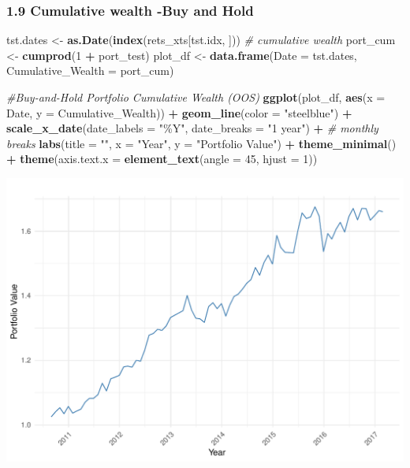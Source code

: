 \documentclass[
  12pt,
]{article}
\newenvironment{Shaded}{\begin{snugshade}}{\end{snugshade}}
\newcommand{\AttributeTok}[1]{\textcolor[rgb]{0.13,0.29,0.53}{#1}}
\newcommand{\CommentTok}[1]{\textcolor[rgb]{0.56,0.35,0.01}{\textit{#1}}}
\newcommand{\DecValTok}[1]{\textcolor[rgb]{0.00,0.00,0.81}{#1}}
\newcommand{\FunctionTok}[1]{\textcolor[rgb]{0.13,0.29,0.53}{\textbf{#1}}}
\newcommand{\NormalTok}[1]{#1}
\newcommand{\OtherTok}[1]{\textcolor[rgb]{0.56,0.35,0.01}{#1}}
\newcommand{\SpecialCharTok}[1]{\textcolor[rgb]{0.81,0.36,0.00}{\textbf{#1}}}
\newcommand{\StringTok}[1]{\textcolor[rgb]{0.31,0.60,0.02}{#1}}
\begin{document}
\subsubsection{1.9 Cumulative wealth -Buy and
Hold}\label{cumulative-wealth--buy-and-hold}

\begin{Shaded}
\begin{Highlighting}[]
\NormalTok{tst.dates }\OtherTok{\textless{}{-}} \FunctionTok{as.Date}\NormalTok{(}\FunctionTok{index}\NormalTok{(rets\_xts[tst.idx, ]))  }
\CommentTok{\# cumulative wealth}
\NormalTok{port\_cum }\OtherTok{\textless{}{-}} \FunctionTok{cumprod}\NormalTok{(}\DecValTok{1} \SpecialCharTok{+}\NormalTok{ port\_test)}
\NormalTok{plot\_df }\OtherTok{\textless{}{-}} \FunctionTok{data.frame}\NormalTok{(}\AttributeTok{Date =}\NormalTok{ tst.dates, }\AttributeTok{Cumulative\_Wealth =}\NormalTok{ port\_cum)}

\CommentTok{\#Buy{-}and{-}Hold Portfolio Cumulative Wealth (OOS)}
\FunctionTok{ggplot}\NormalTok{(plot\_df, }\FunctionTok{aes}\NormalTok{(}\AttributeTok{x =}\NormalTok{ Date, }\AttributeTok{y =}\NormalTok{ Cumulative\_Wealth)) }\SpecialCharTok{+}
  \FunctionTok{geom\_line}\NormalTok{(}\AttributeTok{color =} \StringTok{"steelblue"}\NormalTok{) }\SpecialCharTok{+}
  \FunctionTok{scale\_x\_date}\NormalTok{(}\AttributeTok{date\_labels =} \StringTok{"\%Y"}\NormalTok{, }\AttributeTok{date\_breaks =} \StringTok{"1 year"}\NormalTok{) }\SpecialCharTok{+}  \CommentTok{\# monthly breaks}
  \FunctionTok{labs}\NormalTok{(}\AttributeTok{title =} \StringTok{""}\NormalTok{,}
       \AttributeTok{x =} \StringTok{"Year"}\NormalTok{, }\AttributeTok{y =} \StringTok{"Portfolio Value"}\NormalTok{) }\SpecialCharTok{+}
  \FunctionTok{theme\_minimal}\NormalTok{() }\SpecialCharTok{+}
  \FunctionTok{theme}\NormalTok{(}\AttributeTok{axis.text.x =} \FunctionTok{element\_text}\NormalTok{(}\AttributeTok{angle =} \DecValTok{45}\NormalTok{, }\AttributeTok{hjust =} \DecValTok{1}\NormalTok{))}
\end{Highlighting}
\end{Shaded}

\includegraphics{NDXNES005_A1_RMD_files/figure-latex/unnamed-chunk-9-1.pdf}
\end{document}
